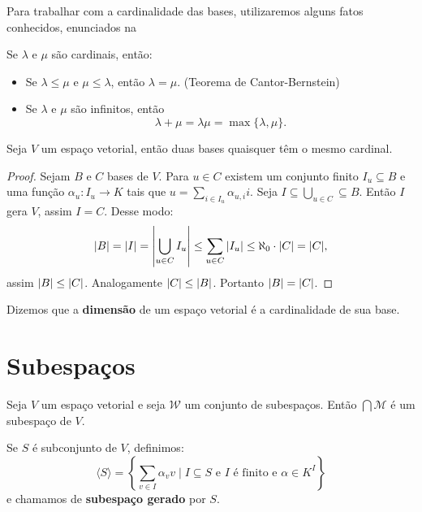\documentclass[11pt,twoside,a4paper]{book}
\begin{document}
Para trabalhar com a cardinalidade das bases, utilizaremos alguns fatos conhecidos, enunciados na
\begin{proposicao}
Se $\lambda$ e $\mu$ são cardinais, então:
\begin{itemize}
\item Se $\lambda\leq\mu$ e $\mu\leq\lambda$, então $\lambda=\mu$. (Teorema de Cantor-Bernstein)
\item Se $\lambda$ e $\mu$ são infinitos, então \[\lambda+\mu=\lambda\mu=\max\{\lambda,\mu\}.\]
\end{itemize}
\end{proposicao}

\begin{teorema}
Seja $V$ um espaço vetorial, então duas bases quaisquer têm o mesmo cardinal.
\end{teorema}
\begin{proof}
Sejam $B$ e $C$ bases de $V$. Para $u\in C$ existem um conjunto finito $I_u\subseteq B$ e uma função $\alpha_u:I_u\rightarrow K$ tais que $u=\sum_{i\in I_u}\alpha_{u,i}i$. Seja $I\subseteq\bigcup_{u\in C}\subseteq B$. Então $I$ gera $V$, assim $I=C$. Desse modo:
\[
\abs{B}=\abs{I}=\abs{\bigcup_{u\in C}I_u}\leq\sum_{u\in C}\abs{I_u}\leq\aleph_0\cdot\abs{C}=\abs{C},
\]
assim $\abs{B}\leq\abs{C}$. Analogamente $\abs{C}\leq\abs{B}$. Portanto $\abs{B}=\abs{C}$.
\end{proof}
\begin{definicao}
Dizemos que a \textbf{dimensão} de um espaço vetorial é a cardinalidade de sua base.
\end{definicao}
\section{Subespaços}

\begin{proposicao}
Seja $V$ um espaço vetorial e seja $\mathcal{W}$ um conjunto de subespaços. Então $\bigcap\mathcal{M}$ é um subespaço de $V$.
\end{proposicao}

\begin{definicao}
Se $S$ é subconjunto de $V$, definimos:
\[
\langle S\rangle=\left\{\sum\limits_{v\in I}\alpha_vv\mid I\subseteq S\text{ e }I\text{ é finito e }\alpha\in K^I\right\}
\]
e chamamos de \textbf{subespaço gerado} por $S$.
\end{definicao}
\end{document}
